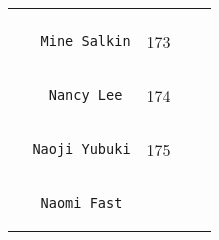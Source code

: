 \documentclass[]{article}
\begin{document}
\begin{longtable}[c]{@{}llll@{}}
\begin{minipage}[t]{0.15\columnwidth}
\end{minipage}
\\\noalign{\medskip}
\begin{minipage}[t]{0.39\columnwidth}\raggedright
\begin{verbatim}
   Mine Salkin
\end{verbatim}
\end{minipage} & \begin{minipage}[t]{0.10\columnwidth}\raggedright
173
\end{minipage} & \begin{minipage}[t]{0.13\columnwidth}\raggedright
\end{minipage} & \begin{minipage}[t]{0.15\columnwidth}\raggedright
\end{minipage}
\\\noalign{\medskip}
\begin{minipage}[t]{0.39\columnwidth}\raggedright
\begin{verbatim}
    Nancy Lee
\end{verbatim}
\end{minipage} & \begin{minipage}[t]{0.10\columnwidth}\raggedright
174
\end{minipage} & \begin{minipage}[t]{0.13\columnwidth}\raggedright
\end{minipage} & \begin{minipage}[t]{0.15\columnwidth}\raggedright
\end{minipage}
\\\noalign{\medskip}
\begin{minipage}[t]{0.39\columnwidth}\raggedright
\begin{verbatim}
  Naoji Yubuki
\end{verbatim}
\end{minipage} & \begin{minipage}[t]{0.10\columnwidth}\raggedright
175
\end{minipage} & \begin{minipage}[t]{0.13\columnwidth}\raggedright
\end{minipage} & \begin{minipage}[t]{0.15\columnwidth}\raggedright
\end{minipage}
\\\noalign{\medskip}
\begin{minipage}[t]{0.39\columnwidth}\raggedright
\begin{verbatim}
   Naomi Fast

\end{verbatim}
\end{minipage}
\end{longtable}
\end{document}
